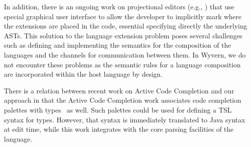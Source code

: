 In addition, there is an ongoing work on projectional editors (e.g., \cite{mps,Diekmann:2013}) that use special graphical user interface to allow the developer to implicitly mark where the extensions are placed in the code, essential specifying directly the underlying ASTs. This solution to the language extension problem poses several challenges such as defining and implementing the semantics for the composition of the languages and the channels for communication between them. In Wyvern, we do not encounter these problems as the semantic rules for a language composition are incorporated within the host language by design.


There is a relation between recent work on Active Code Completion and our approach in that
the Active Code Completion work associates code completion palettes with types~\cite{omar2012active} as well. Such palettes could be used for defining a TSL syntax for types. However, that syntax
is immediately translated to Java syntax at edit time, while this work
integrates with the core parsing facilities of the language.



